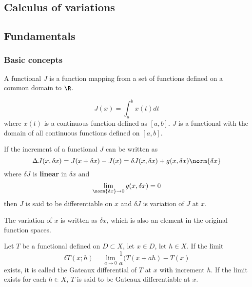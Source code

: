 
\begin{refsection}
\startcontents[chapters]
\chapter{Calculus of variations}\label{ch:calculus-of-variations}
	
\section{Fundamentals}
\subsection{Basic concepts}
\begin{definition}[functional]
\cite[109]{kirk2012optimal}
A functional $J$ is a function mapping from a set of functions defined on a common domain to $\R$.
\end{definition}

\begin{example}
$$J(x) = \int_{a}^b x(t)dt$$
where $x(t)$ is a continuous function defined as $[a,b]$. $J$ is a functional with the domain of all continuous functions defined on $[a,b]$.
\end{example}

\begin{definition}
\cite[117]{kirk2012optimal} 
If the increment of a functional $J$ can be written as
$$\Delta J(x,\delta x) = J(x+\delta x) - J(x) = \delta J(x,\delta x) + g(x,\delta x)\norm{\delta x}$$ 
where $\delta J$ is \textbf{linear} in $\delta x$ and $$\lim_{\norm{\delta x}\to 0} g(x,\delta x) = 0$$
then $J$ is said to be differentiable on $x$ and $\delta J$ is variation of $J$ at $x$.
\end{definition}

\begin{remark}
The variation of $x$ is written as $\delta x$, which is also an element in the original function spaces. 
\end{remark}


\begin{definition}
\cite[172]{luenberger1969optimization}Let $T$ be a functional defined on $D\subset X$, let $x\in D$, let $h\in X$. If the limit 
$$\delta T(x;h) = \lim_{a\to 0}\frac{1}{a}(T(x+ah) - T(x)$$
exists, it is called the Gateaux differential of $T$ at $x$ with increment $h$. If the limit exists for each $h\in X$, $T$ is said to be Gateaux differentiable at $x$.
\end{definition}


\end{refsection}
